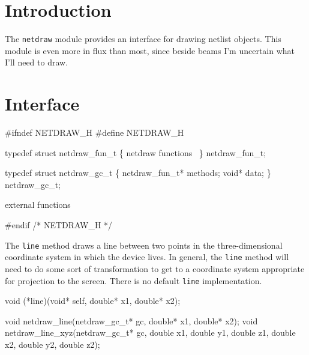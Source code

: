 
\section{Introduction}

The {\tt{}netdraw} module provides an interface for drawing
netlist objects.  This module is even more in flux than most,
since beside beams I'm uncertain what I'll need to draw.


\section{Interface}

\endmoddef
#ifndef NETDRAW_H
#define NETDRAW_H

typedef struct netdraw_fun_t \{
    \LA{}\code{}netdraw\edoc{} functions~{\nwtagstyle{}}\RA{}
\} netdraw_fun_t;

typedef struct netdraw_gc_t \{
    netdraw_fun_t* methods;
    void* data;
\} netdraw_gc_t;

\LA{}external functions~{\nwtagstyle{}}\RA{}

#endif /* NETDRAW_H */
\nwendcode{}\nwdocspar

The {\tt{}line} method draws a line between two points in the
three-dimensional coordinate system in which the device lives.
In general, the {\tt{}line} method will need to do some sort of
transformation to get to a coordinate system appropriate for
projection to the screen.  There is no default {\tt{}line}
implementation.

\nwenddocs{}\endmoddef
void (*line)(void* self, double* x1, double* x2);
\nwendcode{}\nwdocspar

\nwenddocs{}\endmoddef
void netdraw_line(netdraw_gc_t* gc, double* x1, double* x2);
void netdraw_line_xyz(netdraw_gc_t* gc, 
                      double x1, double y1, double z1,
                      double x2, double y2, double z2);
\nwendcode{}\nwdocspar

